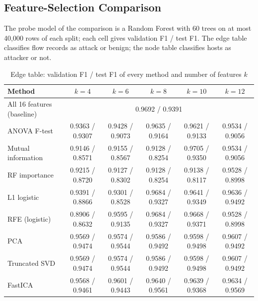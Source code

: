 \begin{appendices}
\section{Feature-Selection Comparison}
The probe model of the comparison is a Random Forest with 60 trees on at most 40,000 rows of each split; each cell gives validation F1 / test F1. The edge table classifies flow records as attack or benign; the node table classifies hosts as attacker or not.

\begin{table}[htbp]\centering\caption{Edge table: validation F1 / test F1 of every method and number of features $k$}\label{tab:fsedge}\scriptsize
\begin{tabular}{|l|c|c|c|c|c|}\hline
\textbf{Method} & \textbf{$k=4$} & \textbf{$k=6$} & \textbf{$k=8$} & \textbf{$k=10$} & \textbf{$k=12$} \\ \hline
All 16 features (baseline) & \multicolumn{5}{c|}{0.9692 / 0.9391} \\ \hline
ANOVA F-test & 0.9363 / 0.9307 & 0.9428 / 0.9073 & 0.9635 / 0.9164 & 0.9621 / 0.9133 & 0.9534 / 0.9056 \\ \hline
Mutual information & 0.9146 / 0.8571 & 0.9155 / 0.8567 & 0.9128 / 0.8254 & 0.9705 / 0.9350 & 0.9534 / 0.9056 \\ \hline
RF importance & 0.9215 / 0.8720 & 0.9127 / 0.8302 & 0.9128 / 0.8254 & 0.9138 / 0.8117 & 0.9528 / 0.8998 \\ \hline
L1 logistic & 0.9391 / 0.8866 & 0.9301 / 0.8528 & 0.9684 / 0.9327 & 0.9641 / 0.9349 & 0.9636 / 0.9492 \\ \hline
RFE (logistic) & 0.8906 / 0.8632 & 0.9595 / 0.9135 & 0.9684 / 0.9327 & 0.9668 / 0.9371 & 0.9528 / 0.8998 \\ \hline
PCA & 0.9569 / 0.9474 & 0.9574 / 0.9544 & 0.9586 / 0.9492 & 0.9598 / 0.9498 & 0.9607 / 0.9492 \\ \hline
Truncated SVD & 0.9569 / 0.9474 & 0.9574 / 0.9544 & 0.9586 / 0.9492 & 0.9598 / 0.9498 & 0.9607 / 0.9492 \\ \hline
FastICA & 0.9568 / 0.9461 & 0.9601 / 0.9443 & 0.9640 / 0.9561 & 0.9639 / 0.9368 & 0.9634 / 0.9569 \\ \hline
\end{tabular}\end{table}


\end{appendices}
